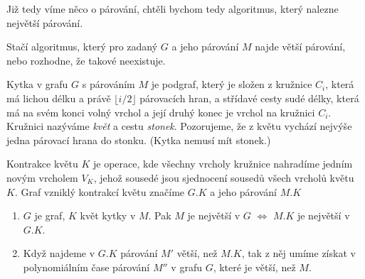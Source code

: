   Již tedy víme něco o párování, chtěli bychom tedy algoritmus, který nalezne největší párování.
\begin{t_observation}
  Stačí algoritmus, který pro zadaný $G$ a jeho párování $M$ najde větší párování, nebo rozhodne, že takové neexistuje.
\end{t_observation}
\begin{t_definition}
  Kytka v grafu $G$ s párováním $M$ je podgraf, který je složen z kružnice $C_i$, která má lichou délku a právě $\lfloor i/2 \rfloor$ párovacích hran, a střídavé cesty sudé délky, která má na svém konci volný vrchol a její druhý konec je vrchol na kružnici $C_i$. Kružnici nazýváme \textit{květ} a cestu \textit{stonek}. Pozorujeme, že z květu vychází nejvýše jedna párovací hrana do stonku. (Kytka nemusí mít stonek.)
\end{t_definition}
\begin{t_definition}
  Kontrakce květu $K$ je operace, kde všechny vrcholy kružnice nahradíme jedním novým vrcholem $V_K$, jehož sousedé jsou sjednocení sousedů všech vrcholů květu $K$. Graf vzniklý kontrakcí květu značíme $G.K$ a jeho párování $M.K$
\end{t_definition}
\begin{t_lemma}
  \begin{enumerate}
    \item $G$ je graf, $K$ květ kytky v $M$. Pak $M$ je největší v $G$ $\iff$ $M.K$ je největší v $G.K$.
    \item Když najdeme v $G.K$ párování $M'$ větší, než $M.K$, tak z něj umíme získat v polynomiálním čase párování $M''$ v grafu $G$, které je větší, než $M$.
  \end{enumerate}
\end{t_lemma}
